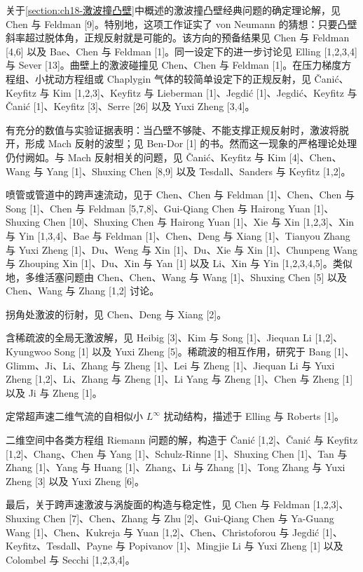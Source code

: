 \documentclass[../../main.tex]{subfiles}
\begin{document}
关于\cref{section:ch18-激波撞凸壁}中概述的激波撞凸壁经典问题的确定理论解，见 Chen 与 Feldman [9]。特别地，这项工作证实了 von Neumann 的猜想：只要凸壁斜率超过脱体角，正规反射就是可能的。该方向的预备结果见 Chen 与 Feldman [4,6] 以及 Bae、Chen 与 Feldman [1]。同一设定下的进一步讨论见 Elling [1,2,3,4] 与 Sever [13]。曲壁上的激波碰撞见 Chen、Chen 与 Feldman [1]。在压力梯度方程组、小扰动方程组或 Chaplygin 气体的较简单设定下的正规反射，见 Čanić、Keyfitz 与 Kim [1,2,3]、Keyfitz 与 Lieberman [1]、Jegdić [1]、Jegdić、Keyfitz 与 Čanić [1]、Keyfitz [3]、Serre [26] 以及 Yuxi Zheng [3,4]。

有充分的数值与实验证据表明：当凸壁不够陡、不能支撑正规反射时，激波将脱开，形成 Mach 反射的波型；见 Ben-Dor [1] 的书。然而这一现象的严格理论处理仍付阙如。与 Mach 反射相关的问题，见 Čanić、Keyfitz 与 Kim [4]、Chen、Wang 与 Yang [1]、Shuxing Chen [8,9] 以及 Tesdall、Sanders 与 Keyfitz [1,2]。

喷管或管道中的跨声速流动，见于 Chen、Chen 与 Feldman [1]、Chen、Chen 与 Song [1]、Chen 与 Feldman [5,7,8]、Gui-Qiang Chen 与 Hairong Yuan [1]、Shuxing Chen [10]、Shuxing Chen 与 Hairong Yuan [1]、Xie 与 Xin [1,2,3]、Xin 与 Yin [1,3,4]、Bae 与 Feldman [1]、Chen、Deng 与 Xiang [1]、Tianyou Zhang 与 Yuxi Zheng [1]、Du、Weng 与 Xin [1]、Du、Xie 与 Xin [1]、Chunpeng Wang 与 Zhouping Xin [1]、Du、Xin 与 Yan [1] 以及 Li、Xin 与 Yin [1,2,3,4,5]。类似地，多维活塞问题由 Chen、Chen、Wang 与 Wang [1]、Shuxing Chen [5] 以及 Chen、Wang 与 Zhang [1,2] 讨论。

拐角处激波的衍射，见 Chen、Deng 与 Xiang [2]。

含稀疏波的全局无激波解，见 Heibig [3]、Kim 与 Song [1]、Jiequan Li [1,2]、Kyungwoo Song [1] 以及 Yuxi Zheng [5]。稀疏波的相互作用，研究于 Bang [1]、Glimm、Ji、Li、Zhang 与 Zheng [1]、Lei 与 Zheng [1]、Jiequan Li 与 Yuxi Zheng [1,2]、Li、Zhang 与 Zheng [1]、Li Yang 与 Zheng [1]、Chen 与 Zheng [1] 以及 Ji 与 Zheng [1]。

定常超声速二维气流的自相似小 $L^\infty$ 扰动结构，描述于 Elling 与 Roberts [1]。

二维空间中各类方程组 Riemann 问题的解，构造于 Čanić [1,2]、Čanić 与 Keyfitz [1,2]、Chang、Chen 与 Yang [1]、Schulz-Rinne [1]、Shuxing Chen [1]、Tan 与 Zhang [1]、Yang 与 Huang [1]、Zhang、Li 与 Zhang [1]、Tong Zhang 与 Yuxi Zheng [3] 以及 Yuxi Zheng [6]。

最后，关于跨声速激波与涡旋面的构造与稳定性，见 Chen 与 Feldman [1,2,3]、Shuxing Chen [7]、Chen、Zhang 与 Zhu [2]、Gui-Qiang Chen 与 Ya-Guang Wang [1]、Chen、Kukreja 与 Yuan [1,2]、Chen、Christoforou 与 Jegdić [1]、Keyfitz、Tesdall、Payne 与 Popivanov [1]、Mingjie Li 与 Yuxi Zheng [1] 以及 Colombel 与 Secchi [1,2,3,4]。
\end{document}
